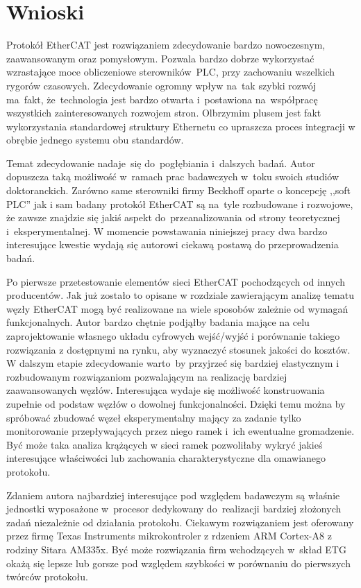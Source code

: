 \section{Wnioski}
Protokół EtherCAT jest rozwiązaniem zdecydowanie bardzo nowoczesnym, zaawansowanym oraz pomysłowym. Pozwala bardzo dobrze wykorzystać wzrastające moce obliczeniowe sterowników~PLC, przy zachowaniu wszelkich rygorów czasowych.
Zdecydowanie ogromny wpływ na~tak szybki rozwój ma~fakt, że~technologia jest bardzo otwarta i~postawiona na~współpracę wszystkich zainteresowanych rozwojem stron. Olbrzymim plusem jest fakt wykorzystania standardowej struktury Ethernetu co upraszcza proces integracji w obrębie jednego systemu obu standardów.

Temat zdecydowanie nadaje~się do~pogłębiania i~dalszych badań. Autor dopuszcza taką możliwość w~ramach prac badawczych w~toku swoich studiów doktoranckich. Zarówno same sterowniki firmy Beckhoff oparte o koncepcję ,,soft PLC'' jak i sam badany protokół EtherCAT są na~tyle rozbudowane i rozwojowe, że zawsze znajdzie się jakiś aspekt do~przeanalizowania od strony teoretycznej i~eksperymentalnej. W momencie powstawania niniejszej pracy dwa bardzo interesujące kwestie wydają się autorowi ciekawą postawą do przeprowadzenia badań.

Po pierwsze przetestowanie elementów sieci EtherCAT pochodzących od innych producentów. 
Jak już zostało to opisane w rozdziale zawierającym analizę tematu węzły EtherCAT mogą być realizowane na wiele sposobów zależnie od wymagań funkcjonalnych. Autor bardzo chętnie podjąłby badania mające na celu zaprojektowanie własnego układu cyfrowych wejść/wyjść i porównanie takiego rozwiązania z dostępnymi na rynku, aby wyznaczyć stosunek jakości do kosztów. W dalszym etapie zdecydowanie warto~by przyjrzeć się bardziej elastycznym i rozbudowanym rozwiązaniom pozwalającym na realizację bardziej zaawansowanych węzłów.
Interesująca wydaje się możliwość konstruowania zupełnie od podstaw węzłów o dowolnej funkcjonalności. Dzięki temu można by spróbować zbudować węzeł eksperymentalny mający za zadanie tylko monitorowanie przepływających przez niego ramek i~ich ewentualne gromadzenie. Być może taka analiza krążących w sieci ramek pozwoliłaby wykryć jakieś interesujące właściwości lub zachowania charakterystyczne dla omawianego protokołu.

Zdaniem autora najbardziej interesujące pod względem badawczym są właśnie jednostki wyposażone w~procesor dedykowany do~realizacji bardziej złożonych zadań niezależnie od działania protokołu. Ciekawym rozwiązaniem jest oferowany przez firmę Texas Instruments mikrokontroler z rdzeniem ARM Cortex-A8 z rodziny Sitara AM335x. Być może rozwiązania firm wchodzących w~skład ETG okażą się lepsze lub gorsze pod względem szybkości w porównaniu do pierwszych twórców protokołu.

